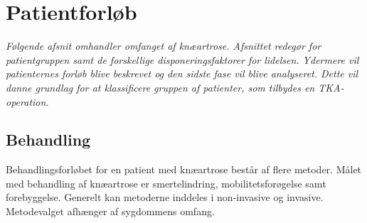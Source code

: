 \section{Patientforløb}
\textit{Følgende afsnit omhandler omfanget af knæartrose. Afsnittet redegør for patientgruppen samt de forskellige disponeringsfaktorer for lidelsen. Ydermere vil patienternes forløb blive beskrevet og den sidste fase vil blive analyseret. Dette vil danne grundlag for at klassificere gruppen af patienter, som tilbydes en TKA-operation.}

\subsection{Behandling}
Behandlingsforløbet for en patient med knæartrose består af flere metoder. Målet med behandling af knæartrose er smertelindring, mobilitetsforøgelse samt forebyggelse. Generelt kan metoderne inddeles i non-invasive og invasive. Metodevalget afhænger af sygdommens omfang. \citep{Lind2016b}

